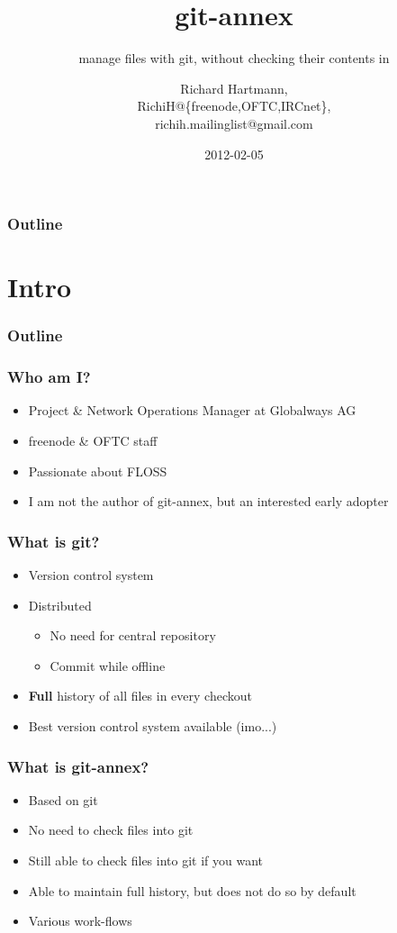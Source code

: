 \documentclass[t]{beamer}
\title{git-annex}
\subtitle{manage files with git, without checking their contents in}
\author{Richard Hartmann,\\
RichiH@\{freenode,OFTC,IRCnet\},\\
richih.mailinglist@gmail.com}
\date{2012-02-05}
\begin{document}
\begin{frame}
	\titlepage
\end{frame}

\begin{frame}
	\frametitle{Outline}
	\tableofcontents
\end{frame}


\section{Intro}

\begin{frame}
	\frametitle{Outline}
	\tableofcontents[currentsection]
\end{frame}

\begin{frame}
	\frametitle{Who am I?}
	\begin{itemize}
		\item Project \& Network Operations Manager at Globalways AG
		\item freenode \& OFTC staff
		\item Passionate about FLOSS
		\item I am not the author of git-annex, but an interested early adopter
	\end{itemize}
\end{frame}

\begin{frame}
	\frametitle{What is git?}
	\begin{itemize}
		\item Version control system
		\item Distributed
		\begin{itemize}
			\item No need for central repository
			\item Commit while offline
		\end{itemize}
		\item \textbf{Full} history of all files in every checkout
		\item Best version control system available (imo...)
	\end{itemize}
\end{frame}

\begin{frame}
	\frametitle{What is git-annex?}
	\begin{itemize}
		\item Based on git
		\item No need to check files into git
		\item Still able to check files into git if you want
		\item Able to maintain full history, but does not do so by default
		\item Various work-flows
	\end{itemize}
\end{frame}
\end{document}
